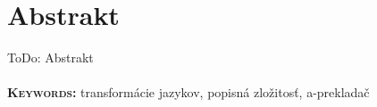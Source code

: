\chapter*{Abstrakt} 
ToDo: Abstrakt
\\
\\
\textbf{\textsc{Keywords:}} transformácie jazykov, popisná zložitosť, a-prekladač

